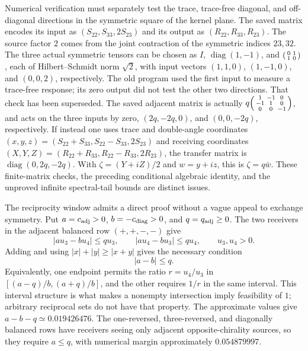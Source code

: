 \documentclass[a4paper,11pt]{article}
\numberwithin{equation}{section}
\theoremstyle{definition}
\begin{document}
Numerical verification must separately test the trace, trace-free diagonal, and off-diagonal directions in the symmetric square of the kernel plane.
The saved matrix encodes its input as $(S_{22},S_{33},2S_{23})$ and its output as
$(R_{22},R_{33},R_{23})$. The source factor $2$ comes from the joint contraction of the symmetric indices $23,32$.
The three actual symmetric tensors can be chosen as $I$, $\operatorname{diag}(1,-1)$, and
$\begin{psmallmatrix}0&1\\1&0\end{psmallmatrix}$, each of Hilbert--Schmidt norm $\sqrt2$,
with input vectors $(1,1,0)$, $(1,-1,0)$, and $(0,0,2)$, respectively.
The old program used the first input to measure a trace-free response; its zero output did not test the other two directions. That check has been superseded.
The saved adjacent matrix is actually
$q\begin{psmallmatrix}1&-1&0\\-1&1&0\\0&0&-1\end{psmallmatrix}$,
and acts on the three inputs by zero, $(2q,-2q,0)$, and $(0,0,-2q)$, respectively.
If instead one uses trace and double-angle coordinates $(x,y,z)=(S_{22}+S_{33},S_{22}-S_{33},2S_{23})$
and receiving coordinates $(X,Y,Z)=(R_{22}+R_{33},R_{22}-R_{33},2R_{23})$,
the transfer matrix is $\operatorname{diag}(0,2q,-2q)$. With
$\zeta=(Y+iZ)/2$ and $w=y+iz$, this is $\zeta=q\bar w$.
These finite-matrix checks, the preceding conditional algebraic identity, and the unproved infinite spectral-tail bounds are distinct issues.

The reciprocity window admits a direct proof without a vague appeal to exchange symmetry. Put
$a=c_{\rm adj}>0$, $b=-c_{\rm diag}>0$, and $q=q_{\rm adj}\ge0$.
The two receivers in the adjacent balanced row $(+,+,-,-)$ give
\[
|au_3-bu_4|\le qu_3,\qquad |au_4-bu_3|\le qu_4,
\qquad u_3,u_4>0.
\]
Adding and using $|x|+|y|\ge|x+y|$ gives the necessary condition
\[
|a-b|\le q.
\]
Equivalently, one endpoint permits the ratio $r=u_4/u_3$ in
$[(a-q)/b,(a+q)/b]$, and the other requires $1/r$ in the same interval. This interval structure is what makes a nonempty intersection imply feasibility of $1$; arbitrary reciprocal sets do not have that property.
The approximate values give $a-b-q\simeq0.019426476$. The one-reversed, three-reversed, and diagonally balanced rows have receivers seeing only adjacent opposite-chirality sources, so they require $a\le q$, with numerical margin approximately $0.054879997$.
\end{document}
